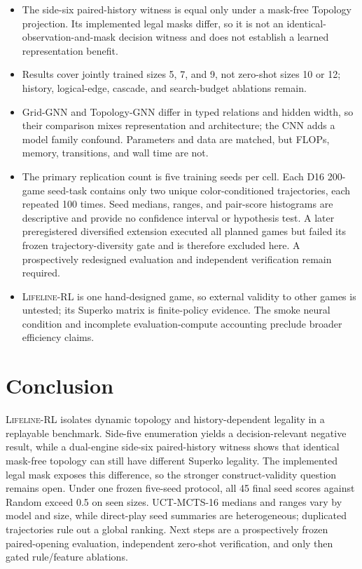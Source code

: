 \documentclass{article}
\newcommand{\lifeline}{\textsc{Lifeline-RL}}
\begin{document}
\begin{itemize}
  \item The side-six paired-history witness is equal only under a mask-free
  Topology projection. Its implemented legal masks differ, so it is not an
  identical-observation-and-mask decision witness and does not establish a
  learned representation benefit.
  \item Results cover jointly trained sizes 5, 7, and 9, not zero-shot sizes 10
  or 12; history, logical-edge, cascade, and search-budget ablations remain.
  \item Grid-GNN and Topology-GNN differ in typed relations and hidden width, so
  their comparison mixes representation and architecture; the CNN adds a model
  family confound. Parameters and data are matched, but FLOPs, memory,
  transitions, and wall time are not.
  \item The primary replication count is five training seeds per cell. Each D16
  200-game seed-task contains only two unique color-conditioned trajectories,
  each repeated 100 times. Seed medians, ranges, and pair-score histograms are
  descriptive and provide no confidence interval or hypothesis test. A later
  preregistered diversified extension executed all planned games but failed its
  frozen trajectory-diversity gate and is therefore excluded here. A
  prospectively redesigned evaluation and independent verification remain
  required.
  \item \lifeline{} is one hand-designed game, so external validity to other
  games is untested; its Superko matrix is finite-policy evidence. The smoke
  neural condition and incomplete evaluation-compute accounting preclude
  broader efficiency claims.
\end{itemize}

\section{Conclusion}
\label{sec:conclusion}

\lifeline{} isolates dynamic topology and history-dependent legality in a
replayable benchmark. Side-five enumeration yields a decision-relevant negative
result, while a dual-engine side-six paired-history witness shows that identical
mask-free topology can still have different Superko legality. The implemented
legal mask exposes this difference, so the stronger construct-validity question
remains open. Under one frozen
five-seed protocol, all 45 final seed scores against Random exceed 0.5 on seen
sizes. UCT-MCTS-16 medians and ranges vary by model and size, while direct-play
seed summaries are heterogeneous; duplicated trajectories rule out a global
ranking. Next steps are a prospectively frozen paired-opening evaluation,
independent zero-shot verification, and only then gated rule/feature ablations.
\end{document}
